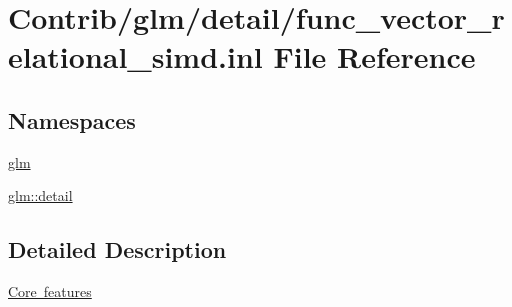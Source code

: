 \hypertarget{func__vector__relational__simd_8inl}{}\section{Contrib/glm/detail/func\+\_\+vector\+\_\+relational\+\_\+simd.inl File Reference}
\label{func__vector__relational__simd_8inl}
\subsection*{Namespaces}
\begin{DoxyCompactItemize}
\item 
 \mbox{\hyperlink{namespaceglm}{glm}}
\item 
 \mbox{\hyperlink{namespaceglm_1_1detail}{glm\+::detail}}
\end{DoxyCompactItemize}


\subsection{Detailed Description}
\mbox{\hyperlink{group__core}{Core features}} 